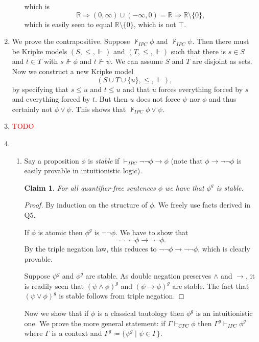 \documentclass{article}
\theoremstyle{plain}
\newtheorem{claim}{Claim}
\begin{document}
\begin{enumerate}
\begin{enumerate}
\[			\]
			which is 
			\[
				\mathbb{R} \Rightarrow (0,\infty) \cup (-\infty,0) = \mathbb{R} \Rightarrow \mathbb{R}\setminus\{0\},
			\]
			which is easily seen to equal $\mathbb{R}\setminus\{0\}$, which is not $\top$.
		\end{enumerate}
		\item We prove the contrapositive. Suppose $\nvdash_{IPC}\phi$ and $\nvdash_{IPC} \psi$. Then there must be Kripke models $(S,\leq, \Vdash)$ and $(T,\leq,\Vdash)$ such that there is $s\in S$ and $t\in T$ with $s\nVdash \phi$ and $t\nVdash \psi$. We can assume $S$ and $T$ are disjoint as sets. Now we construct a new Kripke model
		\[
			(S\cup T\cup \{u\}, \leq ,\Vdash),
		\]
		by specifying that $s\leq u$ and $t\leq u$ and that $u$ forces everything forced by $s$ and everything forced  by $t$. But then $u$ does not force $\psi$ nor $\phi$ and thus certainly not $\phi\vee \psi$. This shows that $\nvdash_{IPC} \phi\vee \psi$.
		\item \textcolor{red}{TODO}
		\item
		\begin{enumerate}
			\item Say a proposition $\phi$ is \emph{stable} if $\vdash_{IPC} \neg\neg \phi \rightarrow \phi$ (note that $\phi \rightarrow \neg\neg \phi$ is easily provable in intuitionistic logic).
			\begin{claim}
				For all quantifier-free sentences $\phi$ we have that $\phi^g$ is stable.
			\end{claim}
			\begin{proof}
				By induction on the structure of $\phi$. We freely use facts derived in Q5.
				
				If $\phi$ is atomic then $\phi^g$ is $\neg\neg\phi$. We have to show that
				\[
				\neg\neg\neg\neg\phi \rightarrow \neg\neg\phi.
				\]
				By the triple negation law, this reduces to $\neg\neg\phi \rightarrow \neg\neg\phi$, which is clearly provable.
				
				Suppose $\psi^g$ and $\phi^g$ are stable. As double negation preserves $\wedge$ and $\rightarrow$, it is readily seen that $(\psi\wedge \phi)^g$ and $(\psi\rightarrow \phi)^g$ are stable. The fact that $(\psi \vee \phi)^g$ is stable follows from triple negation.
			\end{proof}
			Now we show that if $\phi$ is a classical tautology then $\phi^g$ is an intuitionistic one. We prove the more general statement: if $\Gamma \vdash_{CPC} \phi$ then $\Gamma^g \vdash_{IPC} \phi^g$ where $\Gamma$ is a context and $\Gamma^g \coloneqq \{\psi^g\mid \psi \in \Gamma\}$.
			

\end{enumerate}
\end{enumerate}
\end{document}
